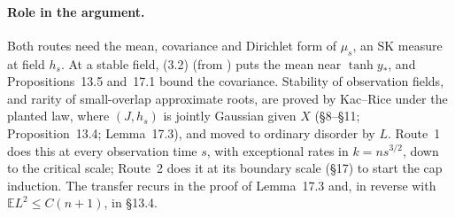 \documentclass[11pt]{article}
\newcommand{\E}{\mathbb{E}}
\newcommand{\ploc}[2]{#1}
\newcommand{\sloc}[2]{\cite[#2]{#1}}
\begin{document}
\paragraph{Role in the argument.}
Both routes need the mean, covariance and Dirichlet form of $\mu_s$, an SK
measure at field $h_s$. At a stable field, (3.2) (from
\sloc{OAI-AcceptedGap}{proof of Proposition~7.2}) puts the mean near
$\tanh y_*$, and Propositions~13.5 and~17.1 bound the covariance. Stability of
observation fields, and rarity of small-overlap approximate roots, are proved
by Kac--Rice under the planted law, where $(J,h_s)$ is jointly Gaussian given
$X$ (\S8--\S11; \ploc{Proposition~13.4}{profile-positive.tex:442--466};
\ploc{Lemma~17.3}{cap-classical.tex:298--314}), and moved to ordinary disorder
by $L$. Route~1 does this at every observation time $s$, with exceptional
rates in $k=ns^{3/2}$, down to the critical scale; Route~2 does it at its
boundary scale (\S17) to start the cap induction. The transfer recurs in
\ploc{the proof of Lemma~17.3}{cap-classical.tex:444--449} and, in reverse with
$\E L^2\le C(n+1)$, in \ploc{\S13.4}{profile-positive.tex:1704--1716}.
\end{document}
